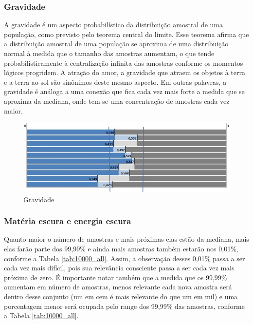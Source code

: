 \subsubsection{Gravidade}
A gravidade é um aspecto probabilístico da distribuição amostral de uma população, como previsto pelo teorema central do limite. Esse teorema afirma que a distribuição amostral de uma população se aproxima de uma distribuição normal à medida que o tamanho das amostras aumentam, o que tende probabilisticamente à centralização infinita das amostras conforme os momentos lógicos progridem. A atração do amor, a gravidade que atraem os objetos à terra e a terra ao sol são sinônimos deste mesmo aspecto. Em outras palavras, a gravidade é análoga a uma conexão que fica cada vez mais forte a medida que se aproxima da mediana, onde tem-se uma concentração de amostras cada vez maior.

\begin{figure}[H]
\caption{Gravidade}
\label{fig:consciousness_gravity}
\centering
\includegraphics[scale=.8]{sections/images/consciousness_gravity.jpg}
\end{figure}

\subsubsection{Matéria escura e energia escura}
Quanto maior o número de amostras e mais próximas elas estão da mediana, mais elas farão parte dos 99,99\% e ainda mais amostras também estarão nos 0,01\%, conforme a Tabela \ref{tab:10000_all}. Assim, a observação desses 0,01\% passa a ser cada vez mais difícil, pois sua relevância consciente passa a ser cada vez mais próxima de zero. É importante notar também que a medida que os 99,99\% aumentam em número de amostras, menos relevante cada nova amostra será dentro desse conjunto (um em cem é mais relevante do que um em mil) e uma porcentagem menor será ocupada pelo range dos 99,99\% das amostras, conforme a Tabela \ref{tab:10000_all}.


